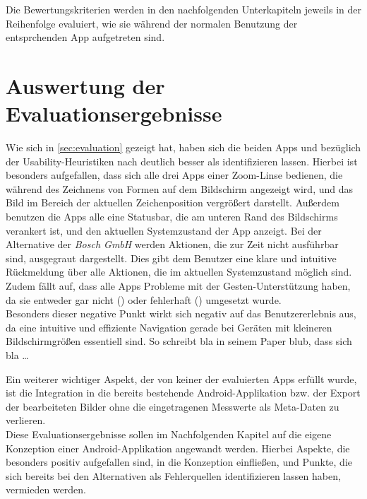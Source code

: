 Die Bewertungskriterien werden in den nachfolgenden Unterkapiteln jeweils in der Reihenfolge evaluiert, wie sie während der normalen Benutzung der entsprchenden App aufgetreten sind.





\section{Auswertung der Evaluationsergebnisse}

Wie sich in \autoref{sec:evaluation} gezeigt hat, haben sich die beiden Apps \mm{} und \pm{} bezüglich der Usability-Heuristiken nach \citeauthor{Nielsen94} deutlich besser als \ms{} identifizieren lassen. 
Hierbei ist besonders aufgefallen, dass sich alle drei Apps einer Zoom-Linse bedienen, die während des Zeichnens von Formen auf dem Bildschirm angezeigt wird, und das Bild im Bereich der aktuellen Zeichenposition vergrößert darstellt.
Außerdem benutzen die Apps alle eine Statusbar, die am unteren Rand des Bildschirms verankert ist, und den aktuellen Systemzustand der App anzeigt.
Bei der Alternative der \emph{Bosch GmbH} werden Aktionen, die zur Zeit nicht ausführbar sind, ausgegraut dargestellt. Dies gibt dem Benutzer eine klare und intuitive Rückmeldung über alle Aktionen, die im aktuellen Systemzustand möglich sind.
Zudem fällt auf, dass alle Apps Probleme mit der Gesten-Unterstützung haben, da sie entweder gar nicht () oder fehlerhaft () umgesetzt wurde. \\
Besonders dieser negative Punkt wirkt sich negativ auf das Benutzererlebnis aus, da eine intuitive und effiziente Navigation gerade bei Geräten mit kleineren Bildschirmgrößen essentiell sind. 
So schreibt bla in seinem Paper blub, dass sich bla \dots

Ein weiterer wichtiger Aspekt, der von keiner der evaluierten Apps erfüllt wurde, ist die Integration in die bereits bestehende Android-Applikation bzw. der Export der bearbeiteten Bilder ohne die eingetragenen Messwerte als Meta-Daten zu verlieren. \\

Diese Evaluationsergebnisse sollen im Nachfolgenden Kapitel auf die eigene Konzeption einer Android-Applikation angewandt werden.
Hierbei Aspekte, die besonders positiv aufgefallen sind, in die Konzeption einfließen, und Punkte, die sich bereits bei den Alternativen als Fehlerquellen identifizieren lassen haben, vermieden werden.
